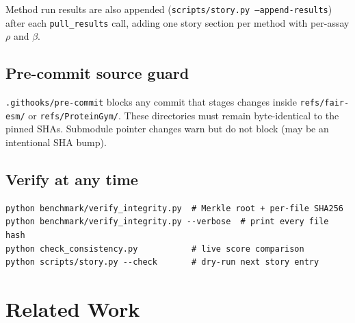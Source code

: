 \documentclass[11pt,a4paper]{article}
\begin{document}
Method run results are also appended (\texttt{scripts/story.py --append-results})
after each \texttt{pull\_results} call, adding one story section per
method with per-assay $\rho$ and $\beta$.

\subsection{Pre-commit source guard}

\texttt{.githooks/pre-commit} blocks any commit that stages changes
inside \texttt{refs/fair-esm/} or \texttt{refs/ProteinGym/}.
These directories must remain byte-identical to the pinned SHAs.
Submodule pointer changes warn but do not block (may be an intentional
SHA bump).

\subsection{Verify at any time}

\begin{lstlisting}[style=shell]
python benchmark/verify_integrity.py  # Merkle root + per-file SHA256
python benchmark/verify_integrity.py --verbose  # print every file hash
python check_consistency.py           # live score comparison
python scripts/story.py --check       # dry-run next story entry
\end{lstlisting}

\section{Related Work}
\end{document}
